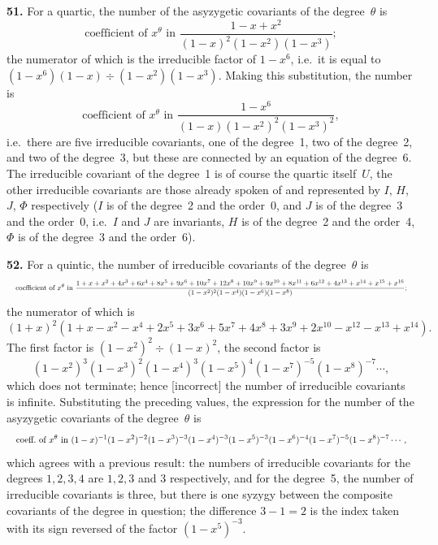 \documentclass[11pt]{article}
\begin{document}
\textbf{51.} For a quartic, the number of the asyzygetic covariants of the degree~$\theta$ is
\[
\text{coefficient of } x^\theta \text{ in } \frac{1-x+x^2}{(1-x)^2(1-x^2)(1-x^3)};
\]
the numerator of which is the irreducible factor of $1-x^6$, i.e.\ it is equal to $(1-x^6)(1-x)\div(1-x^2)(1-x^3)$. Making this substitution, the number is
\[
\text{coefficient of } x^\theta \text{ in } \frac{1-x^6}{(1-x)(1-x^2)^2(1-x^3)^2},
\]
i.e.\ there are five irreducible covariants, one of the degree~1, two of the degree~2, and two of the degree~3, but these are connected by an equation of the degree~6. The irreducible covariant of the degree~1 is of course the quartic itself~$U$, the other irreducible covariants are those already spoken of and represented by $I$, $H$, $J$, $\Phi$ respectively ($I$ is of the degree~2 and the order~0, and $J$ is of the degree~3 and the order~0, i.e.\ $I$ and $J$ are invariants, $H$ is of the degree~2 and the order~4, $\Phi$ is of the degree~3 and the order~6).

\textbf{52.} For a quintic, the number of irreducible covariants of the degree~$\theta$ is
\[ \resizebox{\textwidth}{!}{$\displaystyle
\text{coefficient of } x^\theta \text{ in } \frac{1+x+x^2+4x^3+6x^4+8x^5+9x^6+10x^7+12x^8+10x^9+9x^{10}+8x^{11}+6x^{12}+4x^{13}+x^{14}+x^{15}+x^{16}}{(1-x^2)^2(1-x^4)(1-x^6)(1-x^8)};
$} \]
the numerator of which is
\[
(1+x)^2(1+x-x^2-x^4+2x^5+3x^6+5x^7+4x^8+3x^9+2x^{10}-x^{12}-x^{13}+x^{14}).
\]
The first factor is $(1-x^2)^2\div(1-x)^2$, the second factor is
\[
(1-x^2)^3(1-x^3)^2(1-x^4)^3(1-x^5)^4(1-x^7)^{-5}(1-x^8)^{-7}\cdots,
\]
which does not terminate; hence [incorrect] the number of irreducible covariants is infinite. Substituting the preceding values, the expression for the number of the asyzygetic covariants of the degree~$\theta$ is
\[ \resizebox{\textwidth}{!}{$\displaystyle
\text{coeff.\ of } x^\theta \text{ in } (1-x)^{-1}(1-x^2)^{-2}(1-x^3)^{-3}(1-x^4)^{-3}(1-x^5)^{-3}(1-x^6)^{-4}(1-x^7)^{-5}(1-x^8)^{-7}\cdots,
$} \]
which agrees with a previous result: the numbers of irreducible covariants for the degrees $1, 2, 3, 4$ are $1, 2, 3$ and $3$ respectively, and for the degree~5, the number of irreducible covariants is three, but there is one syzygy between the composite covariants of the degree in question; the difference $3-1=2$ is the index taken with its sign reversed of the factor $(1-x^5)^{-3}$.
\end{document}

